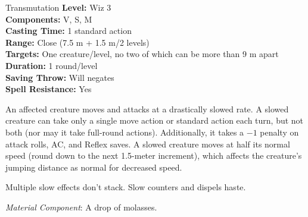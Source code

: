 {Transmutation}
{
	\textbf{Level:}
	Wiz 3\\
	\textbf{Components:}
	V, S, M\\
	\textbf{Casting Time:}
	1 standard action\\
	\textbf{Range:}
	Close (7.5 m + 1.5 m/2 levels)\\
	\textbf{Targets:}
	One creature/level, no two of which can be more than 9 m apart\\
	\textbf{Duration:}
	1 round/level\\
	\textbf{Saving Throw:}
	Will negates\\
	\textbf{Spell Resistance:}
	Yes\\
}
{
	An affected creature moves and attacks at a drastically slowed rate. A slowed creature can take only a single move action or standard action each turn, but not both (nor may it take full-round actions). Additionally, it takes a $-1$ penalty on attack rolls, AC, and Reflex saves. A slowed creature moves at half its normal speed (round down to the next 1.5-meter increment), which affects the creature's jumping distance as normal for decreased speed.

	Multiple slow effects don't stack. Slow counters and dispels haste.

	\textit{Material Component}:
	A drop of molasses.

}
